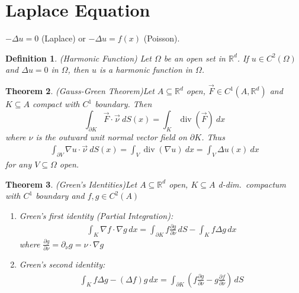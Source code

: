 \documentclass{report}
\theoremstyle{tommy}
\newtheorem{defn}{Definition}
\newtheorem{thm}[defn]{Theorem}
\renewcommand\div{\operatorname{div}}
\begin{document}
  \section{Laplace Equation}
  \(- \Delta u = 0\) (Laplace) or \(-\Delta u = f(x)\) (Poisson).

  \begin{defn} (Harmonic Function)
    Let \(\Omega\) be an open set in \(\mathbb{R}^d\). If \(u \in C^2(\Omega)\) and \(\Delta u = 0\) in \(\Omega\), then \(u\) is a harmonic function in \(\Omega\).
  \end{defn}

  \begin{thm} (Gauss-Green Theorem)\label{gauss-green}
    Let \(A \subseteq \mathbb{R}^d\) open, \(\vec{F} \in C^1(A, \mathbb{R}^d)\) and \(K \subseteq A\) compact with \(C^1\) boundary. Then
    \[ \int_{\partial K} \vec{F} \cdot \vec{\nu}\ dS(x) = \int_K \div(\vec{F})\ dx \]
    where \(\nu\) is the outward unit normal vector field on \(\partial K\).
  Thus
  \begin{align*}
    \int_{\partial V} \nabla u \cdot \vec{\nu}\ dS(x)
    = \int_V \div(\nabla u) \ dx
    = \int_V \Delta u(x) \ dx
  \end{align*}
  for any \(V \subseteq \Omega \) open.
  \end{thm}


  \begin{thm} (Green's Identities)\label{green-identities}
    Let \(A \subseteq \mathbb{R}^d\) open, \(K \subseteq A\) d-dim.\ compactum with \(C^1\) boundary and \(f, g \in C^2(A)\)
    \begin{enumerate}
      \item Green's first identity (Partial Integration): \begin{align*}
        \int_K \nabla f \cdot \nabla g \, dx = \int_{\partial K} f \frac{\partial g}{\partial \nu} \, dS - \int_K f \Delta g \, dx
      \end{align*}
      where \(\frac{\partial g}{\partial \nu} = \partial_\nu g = \nu \cdot \nabla g\)
      \item Green's second identity: \begin{align*}
        \int_K f \Delta g - (\Delta f) g \, dx = \int_{\partial K} \left(f \frac{\partial g}{\partial \nu} - g \frac{\partial f}{\partial \nu}\right) \, dS
      \end{align*}
    \end{enumerate}
  \end{thm}
\end{document}
